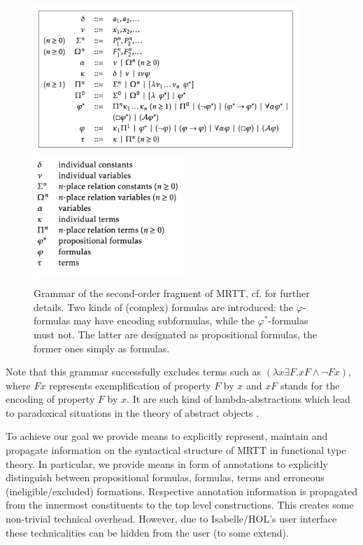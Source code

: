 \begin{isabellebody}
\begin{isamarkuptext}
   \begin{figure}[t]
  \includegraphics[height=5.5cm]{ModalRelationalTypeTheory.png}\includegraphics[height=4.5cm]{ModalRelationalTypeTheory2.png}
  \caption{Grammar of the second-order fragment of MRTT, cf. \cite{zalta:_princ_metap} for further details. \label{mmrt}
  Two kinds of (complex) formulas are introduced: the $\varphi$-formulas may have encoding subformulas, while the
  $\varphi^*$-formulas must not. The latter are designated as propositional formulas, the former ones simply as formulas.}
  \end{figure}
  Note that this grammar successfully excludes terms such as $(\lambda x \exists F. xF \wedge \neg Fx)$, where $Fx$ represents 
  exemplification of property $F$ by $x$ and $xF$ stands for the encoding of property $F$ by $x$. It are such kind of  
  lambda-abstractions which lead to paradoxical situations in the theory of abstract 
  objects \cite[chap.4]{zalta11:_relat_versus_funct_found_logic}.
  

  To achieve our goal we provide means to explicitly represent, maintain and propagate information  on the 
  syntactical structure of MRTT in functional type theory. In particular, we provide means in form of annotations 
  to explicitly distinguish 
  between propositional formulas, formulas, terms and erroneous (ineligible/excluded) formations. 
  Respective annotation information is propagated from the innermost constituents to the top level constructions.
  This creates some non-trivial technical overhead. However, due to Isabelle/HOL's user 
  interface these technicalities can be hidden from the user (to some extend). 


\end{isamarkuptext}
\end{isabellebody}
